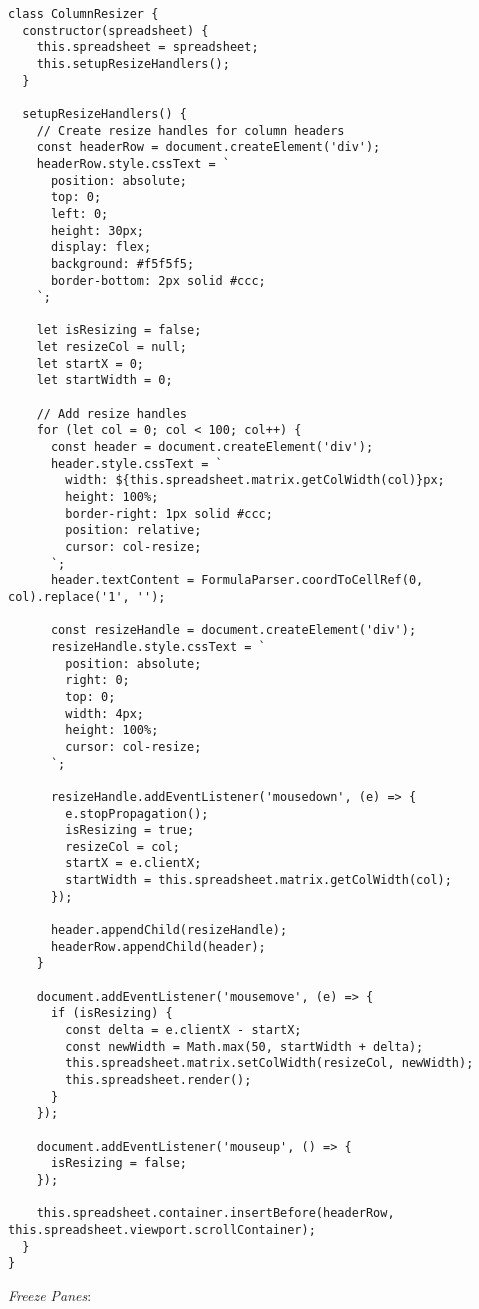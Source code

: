 \documentclass[11pt]{article}
\begin{document}
\begin{verbatim}
class ColumnResizer {
  constructor(spreadsheet) {
    this.spreadsheet = spreadsheet;
    this.setupResizeHandlers();
  }
  
  setupResizeHandlers() {
    // Create resize handles for column headers
    const headerRow = document.createElement('div');
    headerRow.style.cssText = `
      position: absolute;
      top: 0;
      left: 0;
      height: 30px;
      display: flex;
      background: #f5f5f5;
      border-bottom: 2px solid #ccc;
    `;
    
    let isResizing = false;
    let resizeCol = null;
    let startX = 0;
    let startWidth = 0;
    
    // Add resize handles
    for (let col = 0; col < 100; col++) {
      const header = document.createElement('div');
      header.style.cssText = `
        width: ${this.spreadsheet.matrix.getColWidth(col)}px;
        height: 100%;
        border-right: 1px solid #ccc;
        position: relative;
        cursor: col-resize;
      `;
      header.textContent = FormulaParser.coordToCellRef(0, col).replace('1', '');
      
      const resizeHandle = document.createElement('div');
      resizeHandle.style.cssText = `
        position: absolute;
        right: 0;
        top: 0;
        width: 4px;
        height: 100%;
        cursor: col-resize;
      `;
      
      resizeHandle.addEventListener('mousedown', (e) => {
        e.stopPropagation();
        isResizing = true;
        resizeCol = col;
        startX = e.clientX;
        startWidth = this.spreadsheet.matrix.getColWidth(col);
      });
      
      header.appendChild(resizeHandle);
      headerRow.appendChild(header);
    }
    
    document.addEventListener('mousemove', (e) => {
      if (isResizing) {
        const delta = e.clientX - startX;
        const newWidth = Math.max(50, startWidth + delta);
        this.spreadsheet.matrix.setColWidth(resizeCol, newWidth);
        this.spreadsheet.render();
      }
    });
    
    document.addEventListener('mouseup', () => {
      isResizing = false;
    });
    
    this.spreadsheet.container.insertBefore(headerRow, this.spreadsheet.viewport.scrollContainer);
  }
}
\end{verbatim}

\emph{Freeze Panes}:
\end{document}
